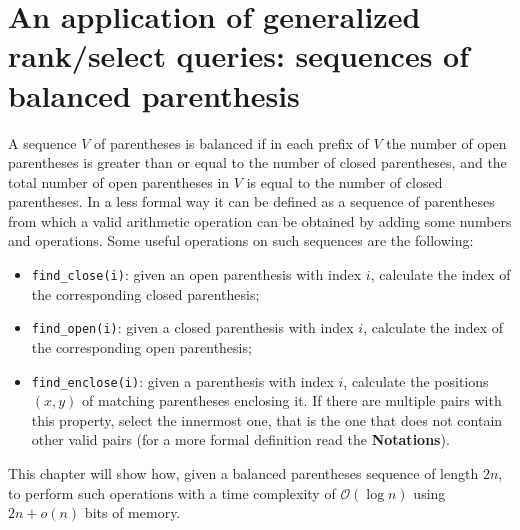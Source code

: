\documentclass{article}
\begin{document}
\section{An application of generalized rank/select queries: sequences of balanced parenthesis}
A sequence $V$ of parentheses is balanced if in each prefix of $V$ the number of open parentheses is greater than or equal to the number of closed parentheses, and the total number of open parentheses in $V$ is equal to the number of closed parentheses. In a less formal way it can be defined as a sequence of parentheses from which a valid arithmetic operation can be obtained by adding some numbers and operations. Some useful operations on such sequences are the following:
    \begin{itemize}
    \item \texttt{find\_close(i)}: given an open parenthesis with index $i$, calculate the index of the corresponding closed parenthesis;
    \item \texttt{find\_open(i)}: given a closed parenthesis with index $i$, calculate the index of the corresponding open parenthesis;
    \item \texttt{find\_enclose(i)}: given a parenthesis with index $i$, calculate the positions $(x,y)$ of matching parentheses enclosing it. If there are multiple pairs with this property, select the innermost one, that is the one that does not contain other valid pairs (for a more formal definition read the \textbf{Notations}). 
    \end{itemize}
This chapter will show how, given a balanced parentheses sequence of length $2n$, to perform such operations with a time complexity of $\mathcal{O}(\log{n})$ using $2n + o(n)$ bits of memory.
\end{document}
